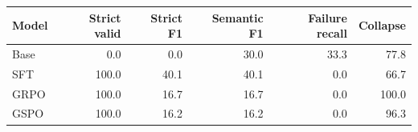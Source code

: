 \begin{tabular}{lrrrrr}
\toprule
Model & Strict valid & Strict F1 & Semantic F1 & Failure recall & Collapse \\
\midrule
Base & 0.0 & 0.0 & 30.0 & 33.3 & 77.8 \\
SFT & 100.0 & 40.1 & 40.1 & 0.0 & 66.7 \\
GRPO & 100.0 & 16.7 & 16.7 & 0.0 & 100.0 \\
GSPO & 100.0 & 16.2 & 16.2 & 0.0 & 96.3 \\
\bottomrule
\end{tabular}
